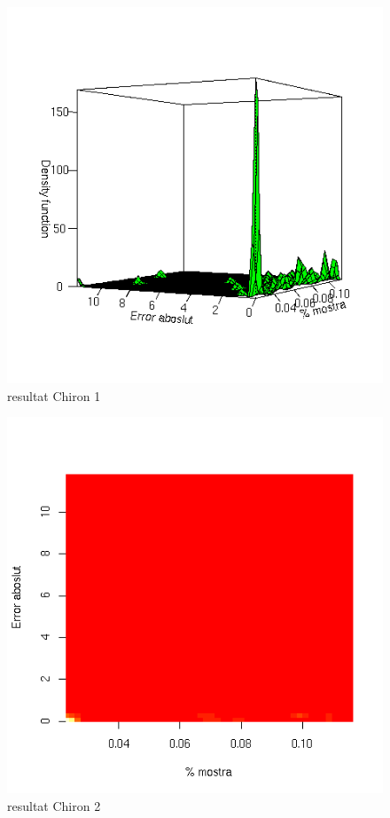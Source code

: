 	\begin{figure}[tbp]
		\begin{center}
			\includegraphics[scale=0.75]{chiron/rgrau1.png}
		\end{center}
		\caption{resultat Chiron 1}
		\label{fig:resChir1}
	\end{figure}

	\begin{figure}[tbp]
		\begin{center}
			\includegraphics[scale=0.75]{chiron/rgrau2.png}
		\end{center}
		\caption{resultat Chiron 2}
		\label{fig:resChir2}
	\end{figure}

